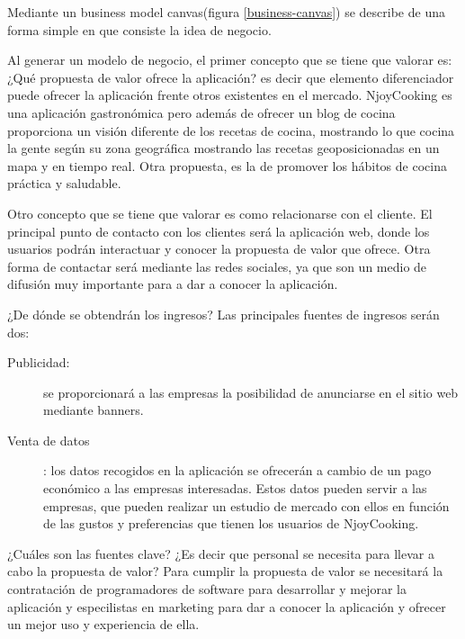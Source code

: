 Mediante un business model canvas(figura \ref{business-canvas}) se describe de una forma simple en que consiste la idea de negocio.

\vspace{5 mm}

Al generar un modelo de negocio, el primer concepto que se tiene que valorar es: ¿Qué propuesta de valor ofrece la aplicación? es decir que elemento
diferenciador puede ofrecer la aplicación frente otros existentes en el mercado. NjoyCooking es una aplicación gastronómica pero además de ofrecer un
blog de cocina proporciona un visión diferente de los recetas de cocina, mostrando lo que cocina la gente según su zona geográfica mostrando las recetas
geoposicionadas en un mapa y en tiempo real. Otra propuesta, es la de promover los hábitos de cocina práctica y saludable.


\vspace{5 mm}

Otro concepto que se tiene que valorar es como relacionarse con el cliente. El principal punto de contacto con los clientes será la aplicación web,
donde los usuarios podrán interactuar y conocer la propuesta de valor que ofrece. Otra forma de contactar será mediante las redes sociales, ya que son
un medio de difusión muy importante para a dar a conocer la aplicación.

\vspace{5 mm}

¿De dónde se obtendrán los ingresos? Las principales fuentes de ingresos serán dos:

\begin{description}

\item [Publicidad:] se proporcionará a las empresas la posibilidad de anunciarse en el sitio web mediante banners.

\item [Venta de datos]: los datos recogidos en la aplicación se ofrecerán a cambio de un pago económico a las empresas interesadas. Estos datos pueden servir a las empresas, que pueden realizar un estudio de mercado con ellos en función de las gustos y preferencias que tienen los usuarios de NjoyCooking.

\end{description}

\vspace{5 mm}

¿Cuáles son las fuentes clave? ¿Es decir que personal se necesita para llevar a cabo la propuesta de valor? Para cumplir la propuesta de valor
se necesitará la contratación de programadores de software para desarrollar y mejorar la aplicación y especilistas en marketing para dar a conocer
la aplicación y ofrecer un mejor uso y experiencia de ella.


